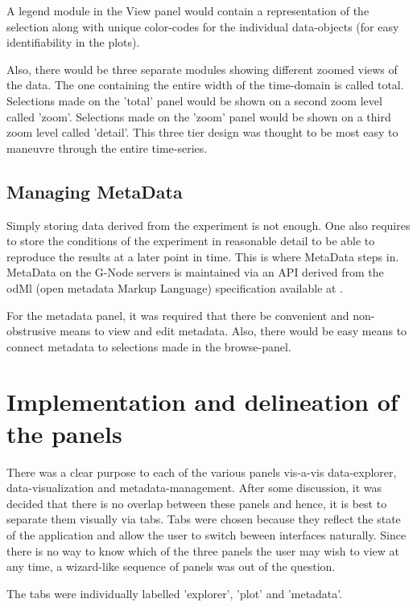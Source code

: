 A legend module in the View panel would contain a representation of
the selection along with unique color-codes for the individual
data-objects (for easy identifiability in the plots).

Also, there would be three separate modules showing different zoomed
views of the data.  The one containing the entire width of the
time-domain is called total.  Selections made on the 'total' panel
would be shown on a second zoom level called 'zoom'.  Selections made
on the 'zoom' panel would be shown on a third zoom level called
'detail'.  This three tier design was thought to be most easy to
maneuvre through the entire time-series.

\subsection{Managing MetaData}

Simply storing data derived from the experiment is not enough.  One
also requires to store the conditions of the experiment in reasonable
detail to be able to reproduce the results at a later point in time.
This is where MetaData steps in.  MetaData on the G-Node servers is
maintained via an API derived from the odMl (open metadata Markup
    Language) specification available at
.

For the metadata panel, it was required that there be convenient and
non-obstrusive means to view and edit metadata.  Also, there would be
easy means to connect metadata to selections made in the browse-panel.


\section{Implementation and delineation of the panels}

There was a clear purpose to each of the various panels vis-a-vis
data-explorer, data-visualization and metadata-management.  After some
discussion, it was decided that there is no overlap between these
panels and hence, it is best to separate them visually via tabs.  Tabs
were chosen because they reflect the state of the application and
allow the user to switch beween interfaces naturally.  Since there is
no way to know which of the three panels the user may wish to view at
any time, a wizard-like sequence of panels was out of the question.

The tabs were individually labelled 'explorer', 'plot' and 'metadata'.

